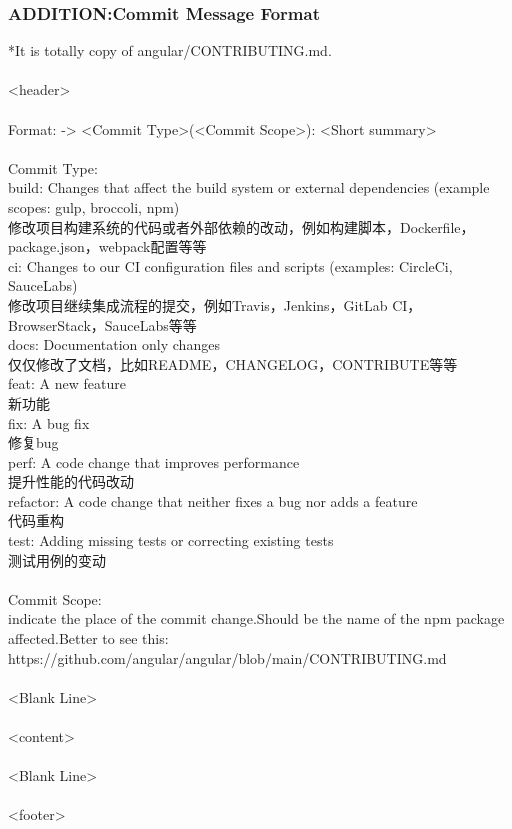 \documentclass{article}
\begin{document}
\subsubsection{ADDITION:Commit Message Format}
*It is totally copy of angular/CONTRIBUTING.md.\\
\\
<header>\\
\\
Format: -> <Commit Type>(<Commit Scope>): <Short summary>\\
\\
Commit Type:\\
build: Changes that affect the build system or external dependencies (example scopes: gulp, broccoli, npm)\\
修改项目构建系统的代码或者外部依赖的改动，例如构建脚本，Dockerfile，package.json，webpack配置等等\\
ci: Changes to our CI configuration files and scripts (examples: CircleCi, SauceLabs)\\
修改项目继续集成流程的提交，例如Travis，Jenkins，GitLab CI，BrowserStack，SauceLabs等等\\
docs: Documentation only changes\\
仅仅修改了文档，比如README，CHANGELOG，CONTRIBUTE等等\\
feat: A new feature\\
新功能\\
fix: A bug fix\\
修复bug\\
perf: A code change that improves performance\\
提升性能的代码改动\\
refactor: A code change that neither fixes a bug nor adds a feature\\
代码重构\\
test: Adding missing tests or correcting existing tests\\
测试用例的变动\\
\\
Commit Scope:\\
indicate the place of the commit change.Should be the name of the npm package affected.Better to see this:\\
https://github.com/angular/angular/blob/main/CONTRIBUTING.md\\
\\
<Blank Line>\\
\\
<content>\\
\\
<Blank Line>\\
\\
<footer>\\
\\
\end{document}
